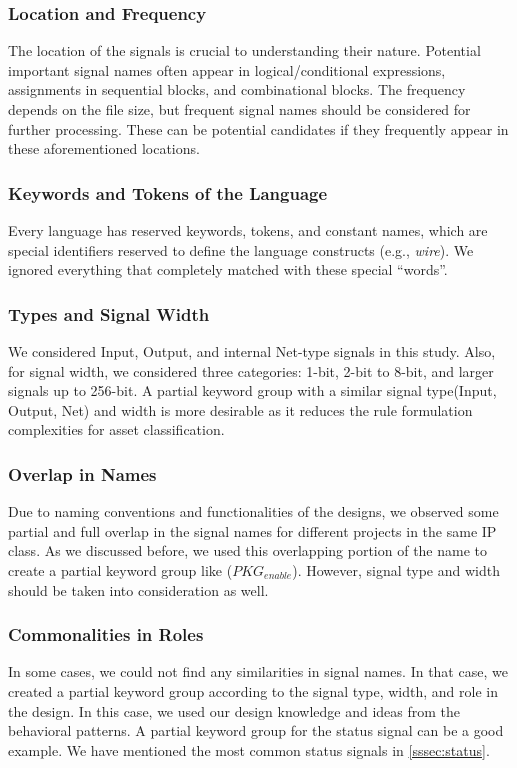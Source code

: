 \subsubsection{Location and Frequency}
The location of the signals is crucial to understanding their nature. Potential important signal names often appear in logical/conditional expressions, assignments in sequential blocks, and combinational blocks. 
The frequency depends on the file size, but frequent signal names should be considered for further processing. These can be potential candidates if they frequently appear in these aforementioned locations.


\subsubsection{Keywords and Tokens of the Language}
Every language has reserved keywords, tokens, and constant names, which are special identifiers reserved to define the language constructs (e.g., \textit{wire}). We ignored everything that completely matched with these special ``words''.


\subsubsection{Types and Signal Width} We considered Input, Output, and internal Net-type signals in this study. Also, for signal width, we considered three categories: 1-bit, 2-bit to 8-bit, and larger signals up to 256-bit. A partial keyword group with a similar signal type(Input, Output, Net) and width is more desirable as it reduces the rule formulation complexities for asset classification.


\subsubsection{Overlap in Names} Due to naming conventions and functionalities of the designs, we observed some partial and full overlap in the signal names for different projects in the same IP class. As we discussed before, we used this overlapping portion of the name to create a partial keyword group like ($PKG_{enable}$). However, signal type and width should be taken into consideration as well.


\subsubsection{Commonalities in Roles} In some cases, we could not find any similarities in signal names. In that case, we created a partial keyword group according to the signal type, width, and role in the design. In this case, we used our design knowledge and ideas from the behavioral patterns. A partial keyword group for the status signal can be a good example. We have mentioned the most common status signals in \autoref{sssec:status}.


